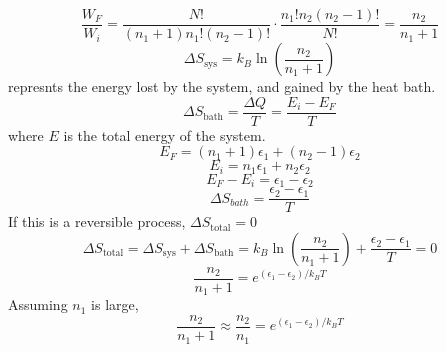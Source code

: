 \begin{equation}
\frac{W_F}{W_i} = \frac{N!}{(n_1 + 1) n_1! (n_2 - 1)!} \cdot \frac{n_1! n_2 (n_2 - 1)!}{N!} = \frac{n_2}{n_1 + 1}
\end{equation}
\begin{equation}
\Delta S_\mathrm{sys} = k_B \ln \left( \frac{n_2}{n_1 + 1} \right)
\end{equation}
represnts the energy lost by the system, and gained by the heat bath.
\begin{equation}
\Delta S_\mathrm{bath} = \frac{\Delta Q}{T} = \frac{E_i - E_F}{T}
\end{equation}
where \(E\) is the total energy of the system.
\begin{equation}
E_F = (n_1 + 1) \epsilon_1 + (n_2 - 1) \epsilon_2
\end{equation}
\begin{equation}
E_i = n_1 \epsilon_1 + n_2 \epsilon_2
\end{equation}
\begin{equation}
E_F - E_i = \epsilon_1 - \epsilon_2
\end{equation}
\begin{equation}
\Delta S_{bath} = \frac{\epsilon_2 - \epsilon_1}{T}
\end{equation}
If this is a reversible process, \(\Delta S_\mathrm{total} = 0\)
\begin{equation}
\Delta S_\mathrm{total} = \Delta S_\mathrm{sys} + \Delta S_\mathrm{bath} = k_B \ln \left( \frac{n_2}{n_1 + 1} \right) + \frac{\epsilon_2 - \epsilon_1}{T} = 0
\end{equation}
\begin{equation}
\frac{n_2}{n_1 + 1} = e^{(\epsilon_1 - \epsilon_2)/k_B T}
\end{equation}
Assuming \(n_1\) is large,
\begin{equation}
\frac{n_2}{n_1 + 1} \approx \frac{n_2}{n_1} = e^{(\epsilon_1 - \epsilon_2)/k_B T}
\end{equation}





